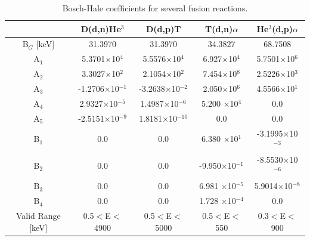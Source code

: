 \begin{table}[ht]
  \centering
  \caption{Bosch-Hale coefficients for several fusion reactions.\cite{bosch1992,mfeformulary}}
  \label{tab:bosch_hale}
  \begin{tabular}{ccccc}
    \T\B& D(d,n)He$^3$ & D(d,p)T & T(d,n)$\alpha$ & He$^3$(d,p)$\alpha$\\
    \hline\hline
    B$_G$ [keV]\T\B& 31.3970 & 31.3970 & 34.3827 & 68.7508 \\
    \hline
    A$_1$\T& 5.3701$\times$10$^4$        & 5.5576$\times$10$^4$      & 6.927$\times$10$^4$      & 5.7501$\times$10$^6$ \\ 
    A$_2$    & 3.3027$\times$10$^2$      & 2.1054$\times$10$^2$      & 7.454$\times$10$^8$      & 2.5226$\times$10$^3$ \\
    A$_3$    & -1.2706$\times$10$^{-1}$  & -3.2638$\times$10$^{-2}$  & 2.050$\times$10$^6$      & 4.5566$\times$10$^1$ \\
    A$_4$    & 2.9327$\times$10$^{-5}$   & 1.4987$\times$10$^{-6}$   & 5.200 $\times$10$^4$     & 0.0 \\
    A$_5$  \B& -2.5151$\times$10$^{-9}$  & 1.8181$\times$10$^{-10}$  & 0.0                      & 0.0 \\
    \hline
    B$_1$\T& 0.0                         & 0.0                       & 6.380 $\times$10$^1$     & -3.1995$\times$10$^{-3}$ \\
    B$_2$    & 0.0                       & 0.0                       & -9.950$\times$10$^{-1}$  & -8.5530$\times$10$^{-6}$ \\
    B$_3$    & 0.0                       & 0.0                       & 6.981 $\times$10$^{-5}$  & 5.9014$\times$10$^{-8}$ \\
    B$_4$\B & 0.0                        & 0.0                       & 1.728 $\times$10$^{-4}$  & 0.0\\
    \hline
    Valid Range [keV] \T\B& 0.5$<$E$<$4900 & 0.5$<$E$<$5000 & 0.5$<$E$<$550 & 0.3$<$E$<$900 \\
  \end{tabular}
\end{table}

